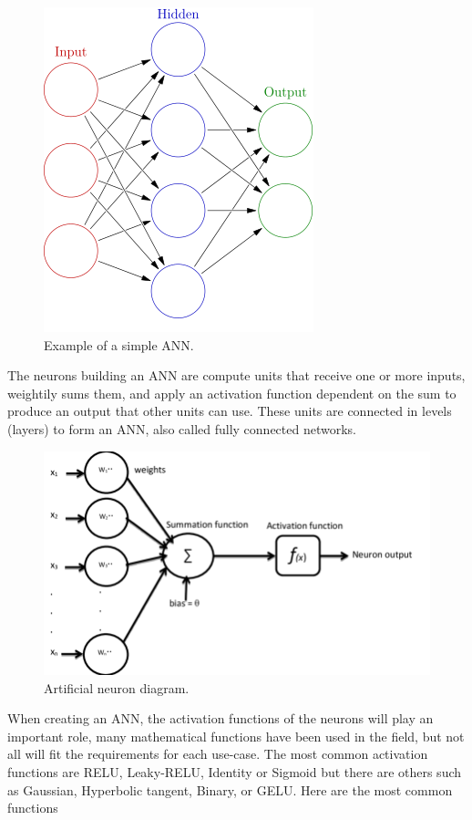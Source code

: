 \documentclass{kththesis}
\begin{document}
\begin{figure}[H]
    \centering
    \includegraphics[scale=0.50]{Colored_neural_network.png}
    \caption{Example of a simple ANN.}
\end{figure}

The neurons building an ANN are compute units that receive one or more inputs, weightily sums them, and apply an activation function dependent on the sum to produce an output that other units can use. These units are connected in levels (layers) to form an ANN, also called fully connected networks. 

\begin{figure}[H]
    \centering
    \includegraphics[width=\textwidth]{The-structure-of-the-artificial-neuron.png}
    \caption{Artificial neuron diagram\cite{neuron-diagram}. }
\end{figure}


When creating an ANN, the activation functions of the neurons will play an important role, many mathematical functions have been used in the field, but not all will fit the requirements for each use-case. The most common activation functions are RELU, Leaky-RELU, Identity or Sigmoid \cite{neurons} but there are others such as Gaussian, Hyperbolic tangent, Binary, or GELU. Here are the most common functions
\end{document}
